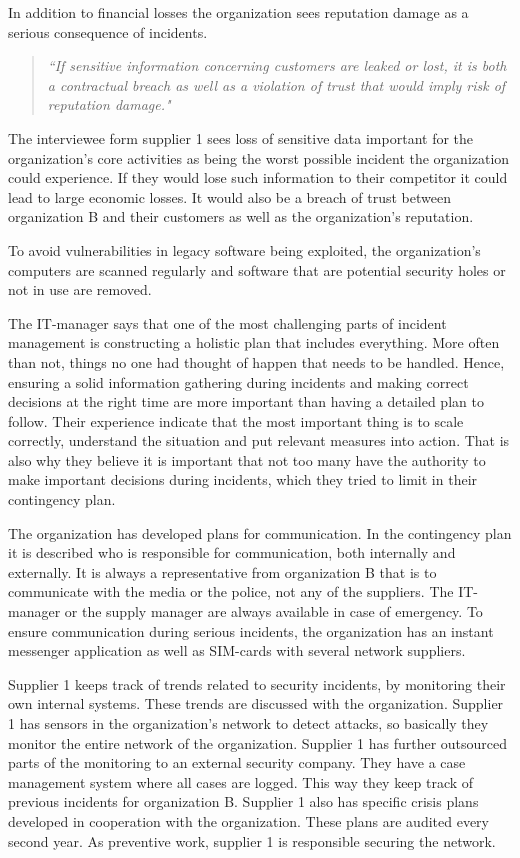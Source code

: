 In addition to financial losses the organization sees reputation damage as a serious consequence of incidents. 
\begin{quote}
\textit{``If sensitive information concerning customers are leaked or lost, it is both a contractual breach as well as a violation of trust that would imply risk of reputation damage."}
\end{quote}

The interviewee form supplier 1 sees loss of sensitive data important for the organization's core activities as being the worst possible incident the organization could experience. If they would lose such information to their competitor it could lead to large economic losses. It would also be a breach of trust between organization B and their customers as well as the organization's reputation.	

To avoid vulnerabilities in legacy software being exploited, the organization's computers are scanned regularly and software that are potential security holes or not in use are removed. 

The IT-manager says that one of the most challenging parts of incident management is constructing a holistic plan that includes everything. More often than not, things no one had thought of happen that needs to be handled. Hence, ensuring a solid information gathering during incidents and making correct decisions at the right time are more important than having a detailed plan to follow. Their experience indicate that the most important thing is to scale correctly, understand the situation and put relevant measures into action. That is also why they believe it is important that not too many have the authority to make important decisions during incidents, which they tried to limit in their contingency plan.

The organization has developed plans for communication. In the contingency plan it is described who is responsible for communication, both internally and externally. It is always a representative from organization B that is to communicate with the media or the police, not any of the suppliers. The IT-manager or the supply manager are always available in case of emergency. To ensure communication during serious incidents, the organization has an instant messenger application as well as SIM-cards with several network suppliers. 

Supplier 1 keeps track of trends related to security incidents, by monitoring their own internal systems. These trends are discussed with the organization. Supplier 1 has sensors in the organization's network to detect attacks, so basically they monitor the entire network of the organization. Supplier 1 has further outsourced parts of the monitoring to an external security company. They have a case management system where all cases are logged. This way they keep track of previous incidents for organization B. Supplier 1 also has specific crisis plans developed in cooperation with the organization. These plans are audited every second year. As preventive work, supplier 1 is responsible securing the network.

